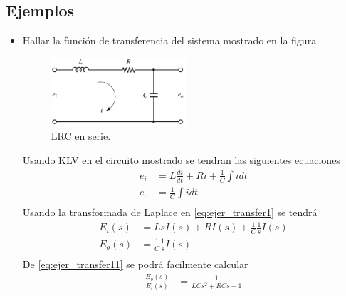 \documentclass[12pt]{article}
\begin{document}
\subsection{Ejemplos}
\begin{itemize}
    \item Hallar la función de transferencia del sistema mostrado en la figura
    \begin{figure}[h]
        \centering
            \includegraphics[width=5cm]{IMAGENES/transfer1}
            \caption{LRC en serie.}
    \end{figure}
    Usando KLV en el circuito mostrado se tendran las siguientes ecuaciones 
    \begin{equation}
        \begin{split}
            e_{i}&=L\frac{di}{dt}+Ri+\frac{1}{C}\int i dt\\
            e_{o}&=\frac{1}{C}\int i dt\\
        \end{split}
        \label{eq:ejer_transfer1}
    \end{equation}
    Usando la transformada de Laplace en \ref{eq:ejer_transfer1} se tendrá
    \begin{equation}
        \begin{split}
            E_{i}(s)&=LsI(s)+RI(s)+\frac{1}{C}\frac{1}{s}I(s)\\
            E_{o}(s)&=\frac{1}{C}\frac{1}{s}I(s)\\
        \end{split}
        \label{eq:ejer_transfer11}
    \end{equation}
    De \ref{eq:ejer_transfer11} se podrá facilmente calcular
    \begin{equation}
    \begin{split}
        \frac{E_{o}(s)}{E_{i}(s)}&=\frac{1}{LCs^2+RCs+1}\\
    \end{split}
    \label{eq:ejer_transfer12}
    \end{equation}


\end{itemize}
\end{document}
